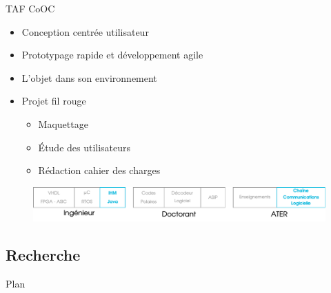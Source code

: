 \documentclass[t,compress,mathserif,12pt,xcolor=dvipsnames]{beamer}
\begin{document}
\begin{frame}[t]{TAF CoOC}
  \begin{minipage}[t][5.0cm][t]{\textwidth}
        \begin{itemize}
          \item Conception centrée utilisateur
          \item Prototypage rapide et développement agile
          \item L'objet dans son environnement
          \item Projet fil rouge
          \begin{itemize}
            \item Maquettage
            \item \'Etude des utilisateurs
            \item Rédaction cahier des charges
          \end{itemize}
        \end{itemize}
  \end{minipage}
  \begin{figure}[htp]
    \centering
    \includegraphics[width=\textwidth]{fig/frise25}
  \end{figure}
\end{frame}

\subsection{Recherche}
\begin{frame}[t]{Plan}
  \centering
  \tableofcontents[
    currentsection,
    currentsubsection,
    sectionstyle=show/show,
    subsectionstyle=show/shaded/shaded,
  ]
\end{frame}
\end{document}

